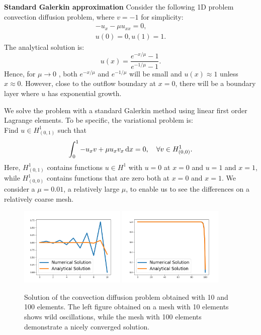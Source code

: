 \begin{example}{\textbf{Standard Galerkin approximation}} \label{ex1} 
Consider the following 1D problem convection diffusion problem, where $v=-1$ for simplicity: 
\begin{eqnarray}
-u_x - \mu u_{xx} = 0, \\ 
u(0) = 0, u(1) = 1 . 
\end{eqnarray}
The analytical solution is: 
\[
u(x) = \frac{e^{-x/\mu} - 1}{e^{-1/\mu} - 1}. 
\]
Hence, for $\mu \rightarrow 0$ , both $e^{-x/\mu}$ and $e^{-1/\mu}$ 
will be small and $u(x) \approx 1$ unless $x\approx 0$. However, close to the 
outflow boundary at $x=0$, there will be a boundary layer where $u$ has exponential growth. 

We solve the problem with a standard Galerkin method using linear first
order Lagrange elements. To be specific, the variational problem is: \\    
Find $u \in H^1_{(0,1)}$ such that 
\[
\int_0^1 -u_x v + \mu u_x v_x \, \mathrm{d}x   = 0, \quad \forall v \in H^1_{(0,0)} .  
\]
Here, $H^1_{(0,1)}$ contains functions $u\in H^1$ with $u=0$ at $x=0$ and $u=1$ and $x=1$, while
$H^1_{(0,0)}$ contains functions that are zero both at $x=0$ and $x=1$. We
consider a $\mu=0.01$, a relatively large $\mu$, to enable us to see the
differences on a relatively coarse mesh.     

\begin{figure}
\begin{center}
\includegraphics[width=0.45\textwidth]{chapters/conv-diff/plots/conv-diff.png}
\includegraphics[width=0.45\textwidth]{chapters/conv-diff/plots/conv-diff-hr.png}
\caption{Solution of the convection diffusion problem obtained with 10 and 100 elements. 
The left figure obtained on a mesh with 10 elements shows wild oscillations, while the 
mesh with 100 elements demonstrate a nicely converged solution.}
\label{fig:conv1}
\end{center}
\end{figure}


\end{example}

